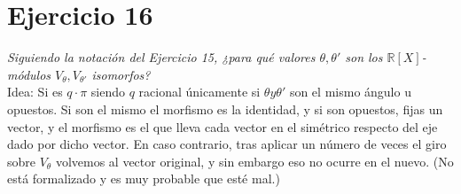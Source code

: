 \section{Ejercicio 16}%
\label{sec:ejercicio_16}
\textit{Siguiendo la notación del Ejercicio 15, ¿para qué valores \(\theta, \theta'\) son los \(\mathbb{R}[X]\)-módulos \(V_\theta, V_{\theta'}\) isomorfos?}\\

Idea: Si es \(q \cdot \pi\) siendo \(q\) racional únicamente si \(\theta y \theta'\) son el mismo ángulo u opuestos. Si son el mismo el morfismo es la identidad, y si son opuestos, fijas un vector, y el morfismo es el que lleva cada vector en el simétrico respecto del eje dado por dicho vector. En caso contrario, tras aplicar un número de veces el giro sobre \(V_\theta\) volvemos al vector original, y sin embargo eso no ocurre en el nuevo. (No está formalizado y es muy probable que esté mal.)
